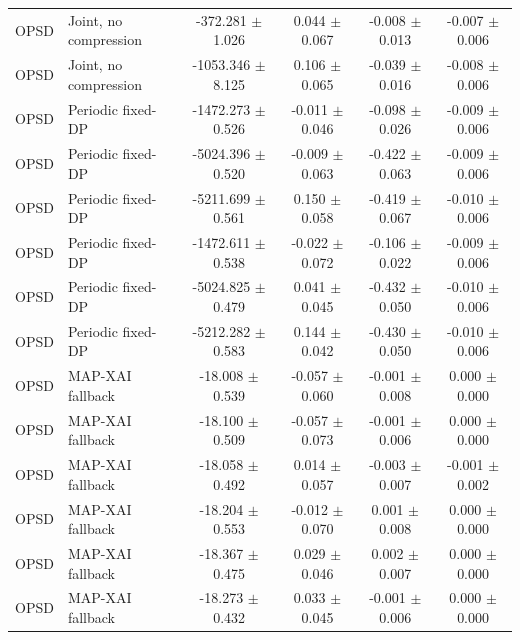\begin{tabular}{llcccc}
OPSD & Joint, no compression & -372.281 $\pm$ 1.026 & 0.044 $\pm$ 0.067 & -0.008 $\pm$ 0.013 & -0.007 $\pm$ 0.006 \\
OPSD & Joint, no compression & -1053.346 $\pm$ 8.125 & 0.106 $\pm$ 0.065 & -0.039 $\pm$ 0.016 & -0.008 $\pm$ 0.006 \\
OPSD & Periodic fixed-DP & -1472.273 $\pm$ 0.526 & -0.011 $\pm$ 0.046 & -0.098 $\pm$ 0.026 & -0.009 $\pm$ 0.006 \\
OPSD & Periodic fixed-DP & -5024.396 $\pm$ 0.520 & -0.009 $\pm$ 0.063 & -0.422 $\pm$ 0.063 & -0.009 $\pm$ 0.006 \\
OPSD & Periodic fixed-DP & -5211.699 $\pm$ 0.561 & 0.150 $\pm$ 0.058 & -0.419 $\pm$ 0.067 & -0.010 $\pm$ 0.006 \\
OPSD & Periodic fixed-DP & -1472.611 $\pm$ 0.538 & -0.022 $\pm$ 0.072 & -0.106 $\pm$ 0.022 & -0.009 $\pm$ 0.006 \\
OPSD & Periodic fixed-DP & -5024.825 $\pm$ 0.479 & 0.041 $\pm$ 0.045 & -0.432 $\pm$ 0.050 & -0.010 $\pm$ 0.006 \\
OPSD & Periodic fixed-DP & -5212.282 $\pm$ 0.583 & 0.144 $\pm$ 0.042 & -0.430 $\pm$ 0.050 & -0.010 $\pm$ 0.006 \\
OPSD & MAP-XAI fallback & -18.008 $\pm$ 0.539 & -0.057 $\pm$ 0.060 & -0.001 $\pm$ 0.008 & 0.000 $\pm$ 0.000 \\
OPSD & MAP-XAI fallback & -18.100 $\pm$ 0.509 & -0.057 $\pm$ 0.073 & -0.001 $\pm$ 0.006 & 0.000 $\pm$ 0.000 \\
OPSD & MAP-XAI fallback & -18.058 $\pm$ 0.492 & 0.014 $\pm$ 0.057 & -0.003 $\pm$ 0.007 & -0.001 $\pm$ 0.002 \\
OPSD & MAP-XAI fallback & -18.204 $\pm$ 0.553 & -0.012 $\pm$ 0.070 & 0.001 $\pm$ 0.008 & 0.000 $\pm$ 0.000 \\
OPSD & MAP-XAI fallback & -18.367 $\pm$ 0.475 & 0.029 $\pm$ 0.046 & 0.002 $\pm$ 0.007 & 0.000 $\pm$ 0.000 \\
OPSD & MAP-XAI fallback & -18.273 $\pm$ 0.432 & 0.033 $\pm$ 0.045 & -0.001 $\pm$ 0.006 & 0.000 $\pm$ 0.000 \\
\bottomrule
\end{tabular}

